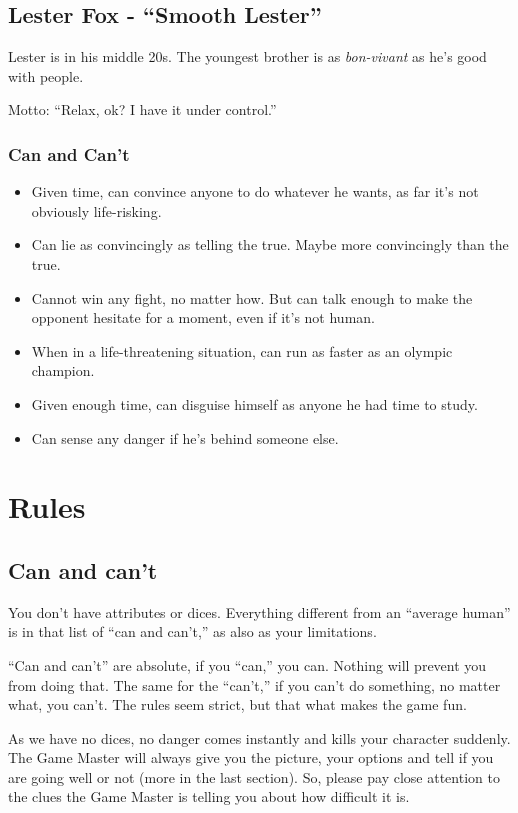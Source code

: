 \documentclass[11pt]{article}
\begin{document}
\subsection{Lester Fox - \enquote{Smooth Lester}}
\label{sec:orgbd708ab}
Lester is in his middle 20s. The youngest brother is as \emph{bon-vivant} as he's good with people.

Motto: \enquote{Relax, ok? I have it under control.}

\subsubsection{Can and Can't}
\label{sec:org2925e14}
\begin{itemize}
\item Given time, can convince anyone to do whatever he wants, as far it's not obviously life-risking.
\item Can lie as convincingly as telling the true. Maybe more convincingly than the true.
\item Cannot win any fight, no matter how. But can talk enough to make the opponent hesitate for a moment, even if it's not human.
\item When in a life-threatening situation, can run as faster as an olympic champion.
\item Given enough time, can disguise himself as anyone he had time to study.
\item Can sense any danger if he's behind someone else.
\end{itemize}

\section{Rules}
\label{sec:org134220e}
\subsection{Can and can't}
\label{sec:org2594811}
You don't have attributes or dices. Everything different from an \enquote{average human} is in that list of \enquote{can and can't,} as also as your limitations.

\enquote{Can and can't} are absolute, if you \enquote{can,} you can. Nothing will prevent you from doing that. The same for the \enquote{can't,} if you can't do something, no matter what, you can't. The rules seem strict, but that what makes the game fun.

As we have no dices, no danger comes instantly and kills your character suddenly. The Game Master will always give you the picture, your options and tell if you are going well or not (more in the last section). So, please pay close attention to the clues the Game Master is telling you about how difficult it is.
\end{document}
